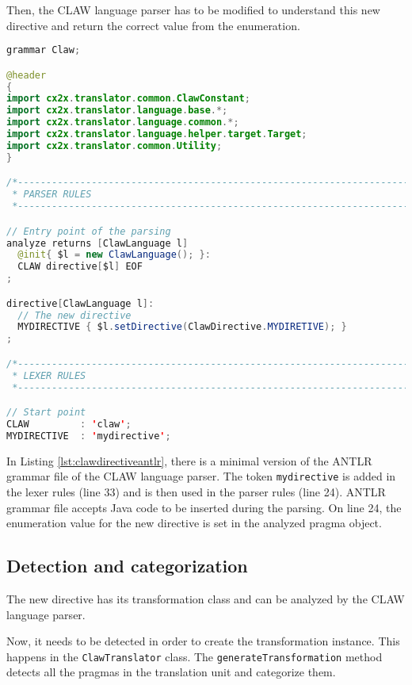 Then, the CLAW language parser has to be modified to understand this new
directive and return the correct value from the enumeration.

\begin{lstlisting}[label=lst:clawdirectiveantlr, caption=Claw.g4, language=java]
grammar Claw;

@header
{
import cx2x.translator.common.ClawConstant;
import cx2x.translator.language.base.*;
import cx2x.translator.language.common.*;
import cx2x.translator.language.helper.target.Target;
import cx2x.translator.common.Utility;
}

/*----------------------------------------------------------------------------
 * PARSER RULES
 *----------------------------------------------------------------------------*/

// Entry point of the parsing
analyze returns [ClawLanguage l]
  @init{ $l = new ClawLanguage(); }:
  CLAW directive[$l] EOF
;

directive[ClawLanguage l]:
  // The new directive
  MYDIRECTIVE { $l.setDirective(ClawDirective.MYDIRETIVE); }
;

/*----------------------------------------------------------------------------
 * LEXER RULES
 *----------------------------------------------------------------------------*/

// Start point
CLAW         : 'claw';
MYDIRECTIVE  : 'mydirective';
\end{lstlisting}

In Listing \ref{lst:clawdirectiveantlr}, there is a minimal version of the
ANTLR grammar file of the CLAW language parser. The token
\lstinline|mydirective| is added in the lexer rules (line 33) and is then
used in the parser rules (line 24). ANTLR grammar file accepts Java code
to be inserted during the parsing. On line 24, the enumeration value for
the new directive is set in the analyzed pragma object.

\subsection{Detection and categorization}
The new directive has its transformation class and can be analyzed by the
CLAW language parser.

Now, it needs to be detected in order to create the transformation instance.
This happens in the \lstinline|ClawTranslator| class. The
\lstinline|generateTransformation| method detects all the pragmas in the 
translation unit and categorize them.


